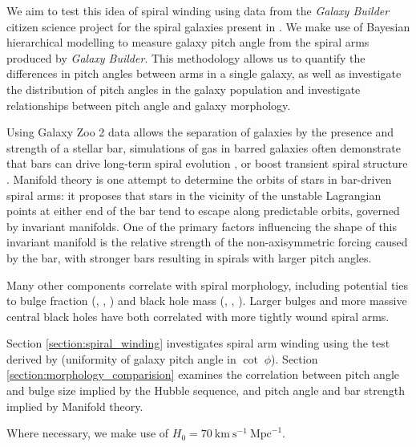 We aim to test this idea of spiral winding using data from the \textit{Galaxy Builder} citizen science project for the spiral galaxies present in \citet{2020arXiv200610450L}. We make use of Bayesian hierarchical modelling to measure galaxy pitch angle from the spiral arms produced by \textit{Galaxy Builder}. This methodology allows us to quantify the differences in pitch angles between arms in a single galaxy, as well as investigate the distribution of pitch angles in the galaxy population and investigate relationships between pitch angle and galaxy morphology.

Using Galaxy Zoo 2 data \citep{Willett2013:1308.3496v2} allows the separation of galaxies by the presence and strength of a stellar bar, simulations of gas in barred galaxies often demonstrate that bars can drive long-term spiral evolution \citep{2008A&A...489..115R}, or boost transient spiral structure \citep{2012MNRAS.426..167G}. Manifold theory is one attempt to determine the orbits of stars in bar-driven spiral arms: it proposes that stars in the vicinity of the unstable Lagrangian points at either end of the bar tend to escape along predictable orbits, governed by invariant manifolds. One of the primary factors influencing the shape of this invariant manifold is the relative strength of the non-axisymmetric forcing caused by the bar, with stronger bars resulting in spirals with larger pitch angles.

Many other components correlate with spiral morphology, including potential ties to bulge fraction (\citealt{1975A&A....44..363Y}, \citealt{2013MNRAS.436.1074S}, \citealt{2019MNRAS.487.1808M}) and black hole mass (\citealt{2008ApJ...678L..93S}, \citealt{2017MNRAS.471.2187D}, \citealt{2019MS&E..571a2118A}). Larger bulges and more massive central black holes have both correlated with more tightly wound spiral arms.

Section \ref{section:spiral_winding} investigates spiral arm winding using the test derived by \cite{2019arXiv190910291P} (uniformity of galaxy pitch angle in $\cot\;\phi$). Section \ref{section:morphology_comparision} examines the correlation between pitch angle and bulge size implied by the Hubble sequence, and pitch angle and bar strength implied by Manifold theory.

Where necessary, we make use of $H_0 = 70\ \text{km}\ \text{s}^{-1}\ \text{Mpc}^{-1}$.
